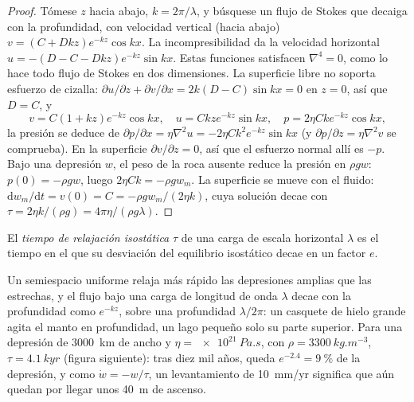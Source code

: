 \begin{proof}
Tómese $z$ hacia abajo, $k = 2\pi/\lambda$, y búsquese un flujo de Stokes que decaiga
con la profundidad, con velocidad vertical (hacia abajo) $v = (C + Dkz)e^{-kz}\cos kx$.
La incompresibilidad da la velocidad horizontal $u = -(D - C - Dkz)e^{-kz}\sin
kx$. Estas funciones satisfacen $\nabla^4 = 0$, como lo hace todo flujo de Stokes
en dos dimensiones. La superficie libre no soporta esfuerzo de cizalla: $\partial u/\partial
z + \partial v/\partial x = 2k(D - C)\sin kx = 0$ en $z = 0$, así que $D = C$, y
\[
  v = C(1 + kz)e^{-kz}\cos kx,\quad u = Ckze^{-kz}\sin kx,\quad
  p = 2\eta Cke^{-kz}\cos kx,
\]
la presión se deduce de $\partial p/\partial x = \eta\nabla^2u = -2\eta
Ck^2e^{-kz}\sin kx$ (y $\partial p/\partial z = \eta\nabla^2v$ se comprueba). En la
superficie $\partial v/\partial z = 0$, así que el esfuerzo normal allí es $-p$. Bajo
una depresión $w$, el peso de la roca ausente reduce la presión en $\rho
gw$: $p(0) = -\rho gw$, luego $2\eta Ck = -\rho gw_m$. La superficie se mueve con el
fluido: $\mathrm dw_m/\mathrm dt = v(0) = C = -\rho gw_m/(2\eta k)$, cuya
solución decae con $\tau = 2\eta k/(\rho g) = 4\pi\eta/(\rho g\lambda)$.
\end{proof}

\begin{definition}\label{def:b3:mantle-convection:relaxation-time}
El \emph{tiempo de relajación isostática} $\tau$ de
una carga de escala horizontal $\lambda$ es el tiempo en el que su desviación del
equilibrio isostático decae en un factor $e$.
\end{definition}

Un semiespacio uniforme relaja más rápido las depresiones amplias que las estrechas, y el
flujo bajo una carga de longitud de onda $\lambda$ decae con la profundidad como $e^{-kz}$, sobre
una profundidad $\lambda/2\pi$: un casquete de hielo grande agita el manto en profundidad, un lago pequeño
solo su parte superior. Para una depresión de \qty{3000}{km} de ancho y $\eta =
\qty{e21}{Pa.s}$, con $\rho = \qty{3300}{kg.m^{-3}}$, $\tau = \qty{4.1}{kyr}$
(figura siguiente): tras diez mil años, queda $e^{-2.4} = \qty{9}{\percent}$ de
la depresión, y como $\dot w = -w/\tau$, un levantamiento de
\qty{10}{mm/yr} significa que aún quedan por llegar unos \qty{40}{m} de ascenso.

